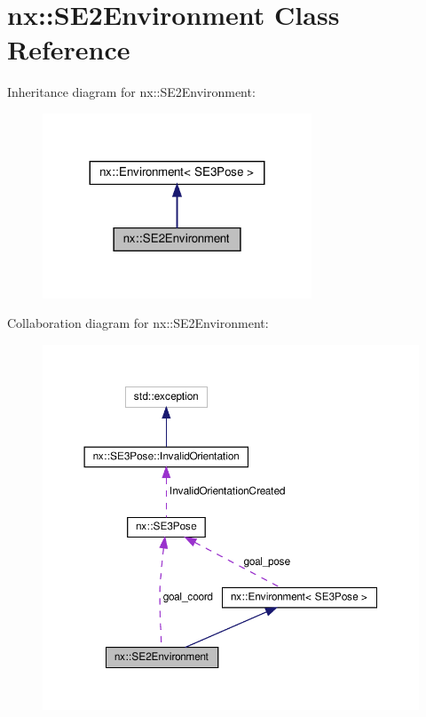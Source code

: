\hypertarget{classnx_1_1SE2Environment}{}\section{nx\+:\+:S\+E2\+Environment Class Reference}
\label{classnx_1_1SE2Environment}


Inheritance diagram for nx\+:\+:S\+E2\+Environment\+:
\nopagebreak
\begin{figure}[H]
\begin{center}
\leavevmode
\includegraphics[width=227pt]{classnx_1_1SE2Environment__inherit__graph}
\end{center}
\end{figure}


Collaboration diagram for nx\+:\+:S\+E2\+Environment\+:
\nopagebreak
\begin{figure}[H]
\begin{center}
\leavevmode
\includegraphics[width=350pt]{classnx_1_1SE2Environment__coll__graph}
\end{center}
\end{figure}
